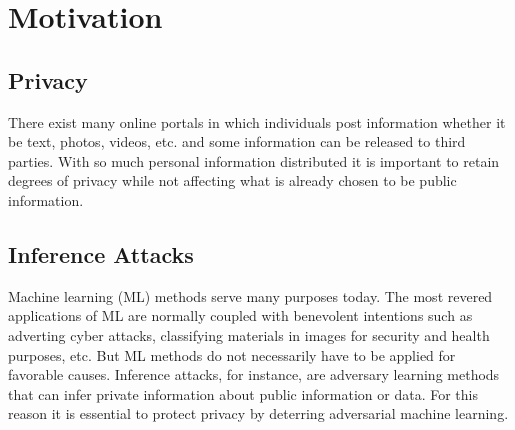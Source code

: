 \documentclass[10pt,twocolumn,letterpaper]{article}
\date{November 20, 2017}
\begin{document}
\title{\vspace{-0.5in}{Application Testing of Generative Adversarial Privacy}}

\author{Nicholas Johnson, Stephanie Sanchez, Vishal Subbiah\\
Stanford University\\
Computational and Mathematical Engineering\\
{nickj@stanford.edu, ssanche2@stanford.edu, svishal@stanford.edu}
}
\maketitle

  


\section{Motivation}
\subsection{Privacy}
There exist many online portals in which individuals post information whether it be text, photos, videos, etc. and some information can be released to third parties. With so much personal information distributed it is important to retain degrees of privacy while not affecting what is already chosen to be public information.   


\subsection{Inference Attacks}
Machine learning (ML) methods serve many purposes today. The most revered applications of ML are normally coupled with benevolent intentions such as adverting cyber attacks, classifying materials in images for security and health purposes, etc. But ML methods do not necessarily have to be applied for favorable causes. Inference attacks, for instance, are adversary learning methods that can infer private information about public information or data. For this reason it is essential to protect privacy by deterring adversarial machine learning. 
\end{document}
